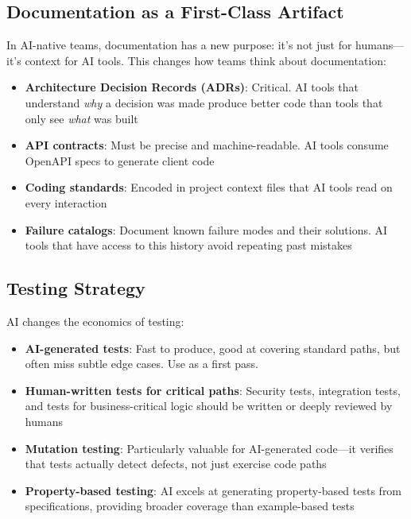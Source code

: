 \subsection{Documentation as a First-Class Artifact}

In AI-native teams, documentation has a new purpose: it's not just for humans---it's context for AI tools. This changes how teams think about documentation:

\begin{itemize}[leftmargin=*]
    \item \textbf{Architecture Decision Records (ADRs)}: Critical. AI tools that understand \emph{why} a decision was made produce better code than tools that only see \emph{what} was built
    \item \textbf{API contracts}: Must be precise and machine-readable. AI tools consume OpenAPI specs to generate client code
    \item \textbf{Coding standards}: Encoded in project context files that AI tools read on every interaction
    \item \textbf{Failure catalogs}: Document known failure modes and their solutions. AI tools that have access to this history avoid repeating past mistakes
\end{itemize}

\subsection{Testing Strategy}

AI changes the economics of testing:

\begin{itemize}[leftmargin=*]
    \item \textbf{AI-generated tests}: Fast to produce, good at covering standard paths, but often miss subtle edge cases. Use as a first pass.
    \item \textbf{Human-written tests for critical paths}: Security tests, integration tests, and tests for business-critical logic should be written or deeply reviewed by humans
    \item \textbf{Mutation testing}: Particularly valuable for AI-generated code---it verifies that tests actually detect defects, not just exercise code paths
    \item \textbf{Property-based testing}: AI excels at generating property-based tests from specifications, providing broader coverage than example-based tests
\end{itemize}


